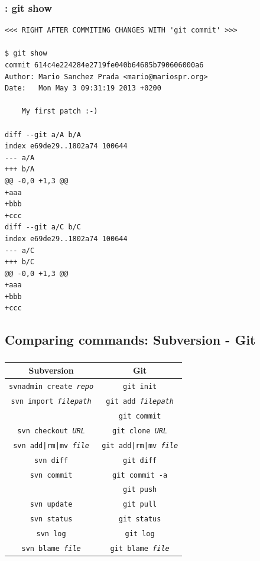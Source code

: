 \begin{frame}[fragile]
  \frametitle{\insertsubsection: git show}

  \begin{tiny}
\begin{verbatim}
<<< RIGHT AFTER COMMITING CHANGES WITH 'git commit' >>>

$ git show
commit 614c4e224284e2719fe040b64685b790606000a6
Author: Mario Sanchez Prada <mario@mariospr.org>
Date:   Mon May 3 09:31:19 2013 +0200

    My first patch :-)

diff --git a/A b/A
index e69de29..1802a74 100644
--- a/A
+++ b/A
@@ -0,0 +1,3 @@
+aaa
+bbb
+ccc
diff --git a/C b/C
index e69de29..1802a74 100644
--- a/C
+++ b/C
@@ -0,0 +1,3 @@
+aaa
+bbb
+ccc
\end{verbatim}
  \end{tiny}

\end{frame}


\subsection{Comparing commands: Subversion - Git}

\begin{frame}
  \frametitle{\insertsubsection}

  \begin{center}
    \begin{tabular}{|c|c|}
      \hline \textbf{Subversion} & \textbf{Git} \\
      \hline \texttt{svnadmin create \textit{repo}} & \texttt{git init} \\
             \texttt{svn import \textit{filepath}} & \texttt{git add \textit{filepath}} \\
             \ & \texttt{git commit} \\
      \hline \texttt{svn checkout \textit{URL}} & \texttt{git clone
        \textit{URL}} \\
      \hline \texttt{svn add|rm|mv \textit{file}} & \texttt{git
        add|rm|mv \textit{file}} \\
      \hline \texttt{svn diff} & \texttt{git diff} \\
      \hline \texttt{svn commit} & \texttt{git commit -a} \\
             \ & \texttt{git push} \\
      \hline \texttt{svn update} & \texttt{git pull} \\
      \hline \texttt{svn status} & \texttt{git status} \\
      \hline \texttt{svn log} & \texttt{git log} \\
      \hline \texttt{svn blame \textit{file}} & \texttt{git blame
        \textit{file}} \\
      \hline
    \end{tabular}
  \end{center}
\end{frame}

